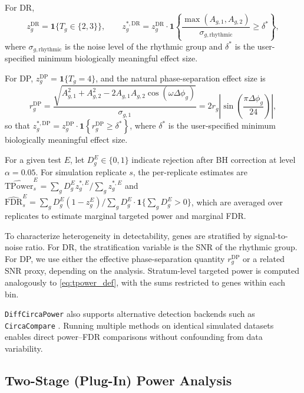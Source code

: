 \documentclass{article}
\newcommand{\software}[1]{\texttt{#1}}
\begin{document}
For DR,
\begin{equation}
z_g^{\mathrm{DR}} = \mathbf{1}\{T_g\in\{2,3\}\},
\qquad
z_g^{*,\mathrm{DR}}
=
z_g^{\mathrm{DR}}
\cdot
\mathbf{1}\!\left\{
\frac{\max(A_{g,1},A_{g,2})}{\sigma_{g,\mathrm{rhythmic}}}\geq\delta^*
\right\},
\label{eq:dr_target}
\end{equation}
where $\sigma_{g,\mathrm{rhythmic}}$ is the noise level of the rhythmic group and $\delta^*$ is the user-specified minimum biologically meaningful effect size.

For DP, \(z_g^{\mathrm{DP}}=\mathbf{1}\{T_g=4\}\), and the natural
phase-separation effect size is
\begin{equation}
r_g^{\mathrm{DP}}
=
\frac{\sqrt{A_{g,1}^2+A_{g,2}^2-2A_{g,1}A_{g,2}\cos(\omega\Delta\phi_g)}}{\sigma_{g,1}}
=
2r_g\left|\sin\!\left(\frac{\pi\Delta\phi_g}{24}\right)\right|,
\label{eq:dp_snr}
\end{equation}
so that \(z_g^{*,\mathrm{DP}}=z_g^{\mathrm{DP}}\cdot
\mathbf{1}\!\left\{r_g^{\mathrm{DP}}\geq\delta^*\right\}\), where $\delta^*$ is the user-specified minimum biologically meaningful effect size.

For a given test $E$, let $D_g^E\in\{0,1\}$ indicate rejection after BH
correction at level $\alpha=0.05$. For simulation replicate $s$, the
per-replicate estimates are
\(\widehat{\mathrm{TPower}}_s^{E}=\sum_g D_g^{E} z_g^{*,E}/\sum_g z_g^{*,E}\)
and
\(\widehat{\mathrm{FDR}}_s^{E}=\sum_g D_g^{E}(1-z_g^{E})/\sum_g D_g^{E}
\cdot\mathbf{1}\!\{\sum_g D_g^{E}>0\}\),
which are averaged over replicates to estimate marginal targeted power and
marginal FDR.

To characterize heterogeneity in detectability, genes are stratified by
signal-to-noise ratio. For DR, the stratification variable is the SNR of the
rhythmic group. For DP, we use either the effective phase-separation quantity
$r_g^{\mathrm{DP}}$ or a related SNR proxy, depending on the analysis. Stratum-level
targeted power is computed analogously to \eqref{eq:tpower_def}, with the
sums restricted to genes within each bin.

\software{DiffCircaPower} also supports alternative detection backends such as
\software{CircaCompare} \cite{parsons2020circacompare}. Running multiple
methods on identical simulated datasets enables direct power--FDR comparisons
without confounding from data variability.

\subsection{Two-Stage (Plug-In) Power Analysis}
\label{sec:two_stage}
\end{document}
